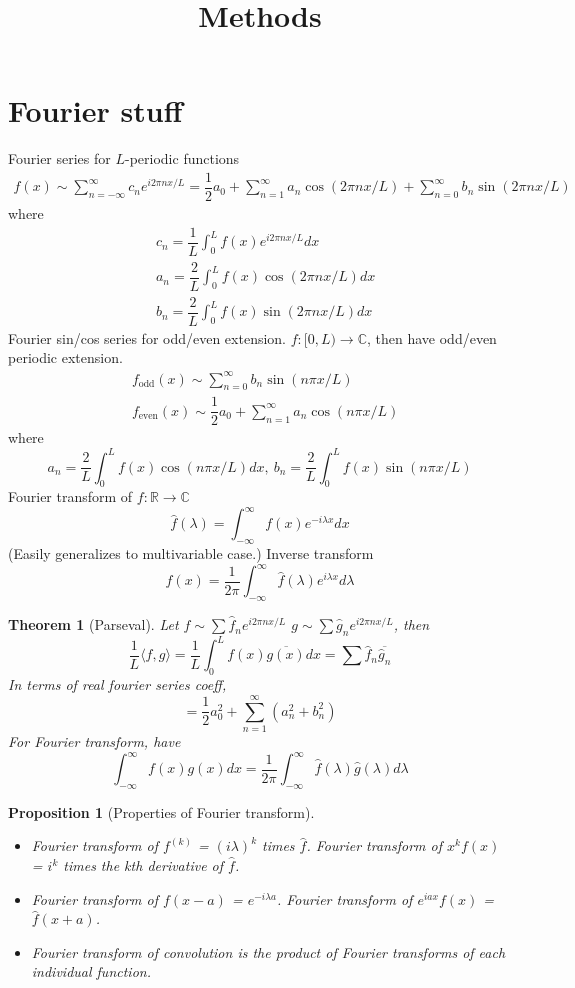 \documentclass{article}
\title{Methods}
\author{ }
\date{ }
\theoremstyle{definition}
\theoremstyle{remark}
\theoremstyle{plain}
\newtheorem{thm}[defn]{Theorem}
\newtheorem{prop}[defn]{Proposition}
\theoremstyle{definition}
\newcommand{\RR}{\mathbb{R}}
\newcommand{\CC}{\mathbb{C}}
\begin{document}
\maketitle
\section{Fourier stuff}
Fourier series for $L$-periodic functions
\begin{align*}
    f(x)\sim \sum_{n=-\infty}^\infty c_n e^{i2\pi n x/L}=\dfrac{1}{2}a_0+\sum_{n=1}^\infty a_n\cos(2\pi nx/L)+\sum_{n=0}^\infty b_n\sin(2\pi nx/L)
\end{align*}
where 
\begin{align*}
    &c_n=\dfrac{1}{L}\int_0^L f(x)e^{i2\pi nx/L}dx\\
    &a_n=\dfrac{2}{L}\int_0^L f(x)\cos(2\pi nx/L)dx\\
    &b_n=\dfrac{2}{L}\int_0^L f(x)\sin(2\pi nx/L)dx
\end{align*}
Fourier sin/cos series for odd/even extension. $f:[0,L)\to\CC$, then have odd/even periodic extension.
\begin{align*}
    &f_{\text{odd}}(x)\sim \sum_{n=0}^\infty b_n\sin(n\pi x/L)\\
    &f_{\text{even}}(x)\sim\dfrac{1}{2}a_0+\sum_{n=1}^\infty a_n\cos(n\pi x/L)
\end{align*}
where
\[a_n=\dfrac{2}{L}\int_0^{L}f(x)\cos(n\pi x/L)dx,\ b_n=\dfrac{2}{L}\int_0^L f(x)\sin(n\pi x/L)\]
Fourier transform of $f:\RR\to\CC$
\[\hat f(\lambda)=\int_{-\infty}^\infty f(x)e^{-i\lambda x}dx\]
(Easily generalizes to multivariable case.)
Inverse transform
\[f(x)=\dfrac{1}{2\pi}\int_{-\infty}^\infty \hat f(\lambda)e^{i\lambda x}d\lambda\]
\begin{thm}[Parseval]
    Let $f\sim\sum \hat f_ne^{i2\pi nx/L}$ $g\sim \sum\hat g_ne^{i2\pi nx/L}$, then
    \[\dfrac{1}{L}\langle f,g\rangle=\dfrac{1}{L}\int_0^Lf(x)\overline{g(x)}dx=\sum \hat f_n\overline{\hat g_n}\]
    In terms of real fourier series coeff, 
    \[=\dfrac{1}{2}a_0^2+\sum_{n=1}^\infty (a_n^2+b_n^2)\]
    For Fourier transform, have
    \[\int_{-\infty}^\infty f(x)g(x)dx=\dfrac{1}{2\pi}\int_{-\infty}^\infty \hat f(\lambda) \hat g(\lambda)d\lambda\]
\end{thm}
\begin{prop}[Properties of Fourier transform]
    \begin{itemize}
        \item Fourier transform of $f^{(k)}$ = $(i\lambda)^k$ times $\hat f$. Fourier transform of $x^k f(x)$ = $i^k$ times the kth derivative of $\hat f$.
        \item Fourier transform of $f(x-a)$ = $e^{-i\lambda a}$. Fourier transform of $e^{iax}f(x)$ = $\hat f(x+a)$.
        \item Fourier transform of convolution is the product of Fourier transforms of each individual function.
    \end{itemize}
\end{prop}
\end{document}

